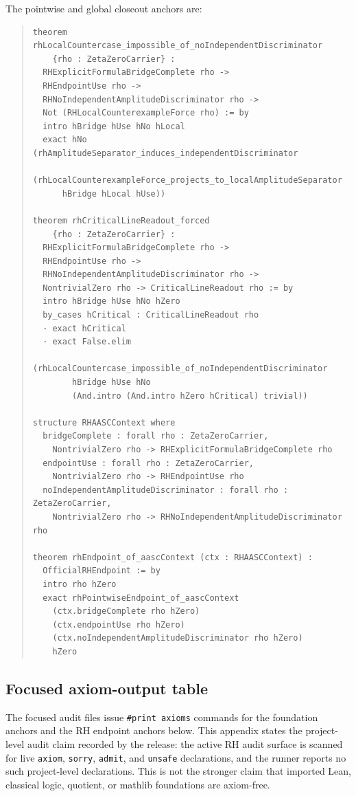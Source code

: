 \documentclass[11pt]{article}
\begin{document}
The pointwise and global closeout anchors are:
\begin{quote}\footnotesize\begin{verbatim}
theorem rhLocalCountercase_impossible_of_noIndependentDiscriminator
    {rho : ZetaZeroCarrier} :
  RHExplicitFormulaBridgeComplete rho ->
  RHEndpointUse rho ->
  RHNoIndependentAmplitudeDiscriminator rho ->
  Not (RHLocalCounterexampleForce rho) := by
  intro hBridge hUse hNo hLocal
  exact hNo (rhAmplitudeSeparator_induces_independentDiscriminator
    (rhLocalCounterexampleForce_projects_to_localAmplitudeSeparator
      hBridge hLocal hUse))

theorem rhCriticalLineReadout_forced
    {rho : ZetaZeroCarrier} :
  RHExplicitFormulaBridgeComplete rho ->
  RHEndpointUse rho ->
  RHNoIndependentAmplitudeDiscriminator rho ->
  NontrivialZero rho -> CriticalLineReadout rho := by
  intro hBridge hUse hNo hZero
  by_cases hCritical : CriticalLineReadout rho
  · exact hCritical
  · exact False.elim
      (rhLocalCountercase_impossible_of_noIndependentDiscriminator
        hBridge hUse hNo
        (And.intro (And.intro hZero hCritical) trivial))

structure RHAASCContext where
  bridgeComplete : forall rho : ZetaZeroCarrier,
    NontrivialZero rho -> RHExplicitFormulaBridgeComplete rho
  endpointUse : forall rho : ZetaZeroCarrier,
    NontrivialZero rho -> RHEndpointUse rho
  noIndependentAmplitudeDiscriminator : forall rho : ZetaZeroCarrier,
    NontrivialZero rho -> RHNoIndependentAmplitudeDiscriminator rho

theorem rhEndpoint_of_aascContext (ctx : RHAASCContext) :
  OfficialRHEndpoint := by
  intro rho hZero
  exact rhPointwiseEndpoint_of_aascContext
    (ctx.bridgeComplete rho hZero)
    (ctx.endpointUse rho hZero)
    (ctx.noIndependentAmplitudeDiscriminator rho hZero)
    hZero
\end{verbatim}\end{quote}

\subsection{Focused axiom-output table}

The focused audit files issue \texttt{\#print axioms} commands for the foundation anchors and the RH endpoint anchors below.  This appendix states the project-level audit claim recorded by the release: the active RH audit surface is scanned for live \texttt{axiom}, \texttt{sorry}, \texttt{admit}, and \texttt{unsafe} declarations, and the runner reports no such project-level declarations.  This is not the stronger claim that imported Lean, classical logic, quotient, or mathlib foundations are axiom-free.
\end{document}
